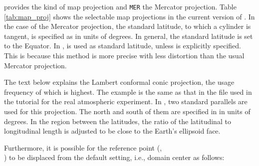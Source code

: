  provides the kind of map projection and \verb|MER| the Mercator projection.
Table \ref{tab:map_proj} shows the selectable map projections in the current version of \scalerm. In the case of the Mercator projection, the standard latitude, to which a cylinder is tangent, is specified as  in units of degrees. In general, the standard latitude is set to the Equator.
In \scalerm,  is used as standard latitude, unless  is explicitly specified. This is because this method is more precise with less distortion than the usual Mercator projection.

The text below explains the Lambert conformal conic projection, the usage frequency of which is highest. The example is the same as that in the file used in the tutorial for the real atmospheric experiment.
In \scalerm, two standard parallels are used for this projection.
The north and south of them are specified in  
in units of degrees.
In the region between the latitudes, the ratio of the latitudinal to longitudinal length is adjusted to be close to the Earth’s ellipsoid face.


Furthermore, it is possible for the reference point (,\\
) to be displaced from the default setting, i.e., domain center as follows:


